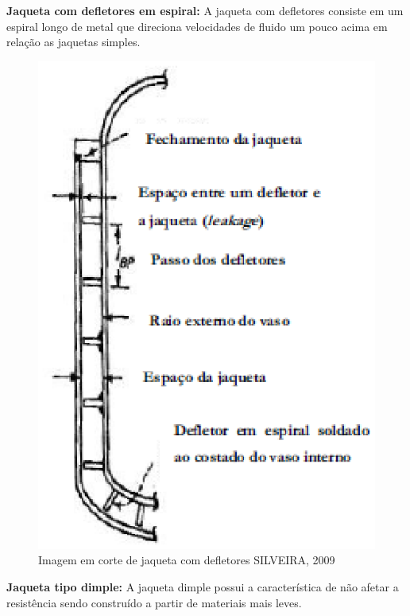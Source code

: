\textbf{Jaqueta com defletores em espiral:} A jaqueta com defletores consiste em um espiral longo de metal que direciona velocidades de fluido um pouco acima em relação as jaquetas simples.

\begin{figure}[h]
	\centering
	\includegraphics[keepaspectratio=true,scale=0.6]{figuras/jaqueta2.eps}
	\caption{Imagem em corte de jaqueta com defletores SILVEIRA, 2009}
	\label{jaqueta2}
\end{figure}

\textbf{Jaqueta tipo dimple:} A jaqueta dimple possui a característica de não afetar a resistência sendo construído a partir de materiais mais leves.

